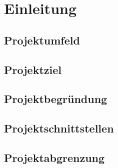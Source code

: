 \section{Einleitung}
\blindtext
\subsection{Projektumfeld}
\subsection{Projektziel}
\subsection{Projektbegründung}
\subsection{Projektschnittstellen}
\subsection{Projektabgrenzung}